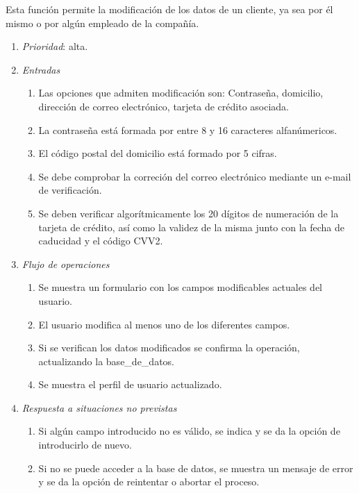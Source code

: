 

 \label{fun:editarcliente}
	Esta función permite la modificación de los datos de un cliente, ya sea por él mismo o por algún empleado de la compañía.

	\begin{enumerate}
		\item \textit{Prioridad}: alta.
		\item \textit{Entradas}
		\begin{enumerate}
			\item Las opciones que admiten modificación son: Contraseña, domicilio, dirección de correo electrónico, tarjeta de crédito asociada.
			\item La contraseña está formada por entre 8 y 16 caracteres alfanúmericos.
			\item El código postal del domicilio está formado por 5 cifras.
			\item Se debe comprobar la correción del correo electrónico mediante un e-mail de verificación.
			\item Se deben verificar algorítmicamente los 20 dígitos de numeración de la tarjeta de crédito, así como la validez de la misma junto con la fecha de caducidad y el código \gls{CVV2}.
		\end{enumerate}
		\item \textit{Flujo de operaciones}
		\begin{enumerate}
			\item Se muestra un formulario con los campos modificables actuales del usuario.
			\item El usuario modifica al menos uno de los diferentes campos.
			\item Si se verifican los datos modificados se confirma la operación, actualizando la \gls{base_de_datos}.
			\item Se muestra el perfil de usuario actualizado.
		\end{enumerate}
		\item \textit{Respuesta a situaciones no previstas}
		\begin{enumerate}
			\item Si algún campo introducido no es válido, se indica y se da la opción de introducirlo de nuevo.
			\item Si no se puede acceder a la base de datos, se muestra un mensaje de error y se da la opción de reintentar o abortar el proceso.
		\end{enumerate}
	\end{enumerate}
